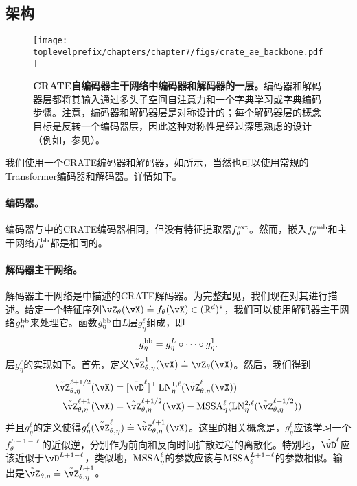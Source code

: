 \documentclass[../../book-main.tex]{subfiles}
\begin{document}
\subsection{架构}\label{sub:image_completion_architecture}

\begin{figure}
    \centering 
    \texttt{[image: \\toplevelprefix/chapters/chapter7/figs/crate\_ae\_backbone.pdf]}
    \caption{\small\textbf{CRATE自编码器主干网络中编码器和解码器的一层。}编码器和解码器层都将其输入通过多头子空间自注意力和一个字典学习或字典编码步骤。注意，编码器和解码器层是对称设计的；每个解码器层的概念目标是反转一个编码器层，因此这种对称性是经过深思熟虑的设计（例如，参见）。}
\end{figure}

我们使用一个CRATE编码器和解码器，如所示，当然也可以使用常规的Transformer编码器和解码器。详情如下。

\paragraph{编码器。} 编码器与中的CRATE编码器相同，但没有特征提取器\(f_{\theta}^{\mathrm{ext}}\)。然而，嵌入\(f_{\theta}^{\mathrm{emb}}\)和主干网络\(f_{\theta}^{\mathrm{bb}}\)都是相同的。

\paragraph{解码器主干网络。} 解码器主干网络是中描述的CRATE解码器。为完整起见，我们现在对其进行描述。给定一个特征序列\(\vZ_{\theta}(\vX) \doteq f_{\theta}(\vX) \in (\R^{d})^{*}\)，我们可以使用解码器主干网络\(g_{\eta}^{\mathrm{bb}}\)来处理它。函数\(g_{\eta}^{\mathrm{bb}}\)由\(L\)层\(g_{\eta}^{\ell}\)组成，即
\begin{equation}
    g_{\eta}^{\mathrm{bb}} = g_{\eta}^{L} \circ \cdots \circ g_{\eta}^{1}.
\end{equation}
层\(g_{\eta}^{\ell}\)的实现如下。首先，定义\(\tilde{\vZ}_{\theta, \eta}^{1}(\vX) \doteq \vZ_{\theta}(\vX)\)。然后，我们得到
\begin{align}
    \tilde{\vZ}_{\theta, \eta}^{\ell + 1/2}(\vX) 
    &= [\tilde{\vD}^{\ell}]^{\top}\LN_{\eta}^{1, \ell}(\tilde{\vZ}_{\theta, \eta}^{\ell}(\vX)) \\ 
    \tilde{\vZ}_{\theta, \eta}^{\ell + 1}(\vX)
    &= \tilde{\vZ}_{\theta, \eta}^{\ell + 1/2}(\vX) - \MSSA_{\eta}^{\ell}(\LN_{\eta}^{2, \ell}(\tilde{\vZ}_{\theta, \eta}^{\ell + 1/2}))
\end{align}
并且\(g_{\eta}^{\ell}\)的定义使得\(g_{\eta}^{\ell}(\tilde{\vZ}_{\theta, \eta}^{\ell}) \doteq \tilde{\vZ}_{\theta, \eta}^{\ell + 1}(\vX)\)。这里的相关概念是，\(g_{\eta}^{\ell}\)应该学习一个\(f_{\theta}^{L + 1 - \ell}\)的近似逆，分别作为前向和反向时间扩散过程的离散化。特别地，\(\tilde{\vD}^{\ell}\)应该近似于\(\vD^{L + 1 - \ell}\)，类似地，\(\operatorname{MSSA}_{\eta}^{\ell}\)的参数应该与\(\operatorname{MSSA}_{\theta}^{L + 1 - \ell}\)的参数相似。输出是\(\tilde{\vZ}_{\theta, \eta} \doteq \tilde{\vZ}_{\theta, \eta}^{L + 1}\)。
\end{document}
